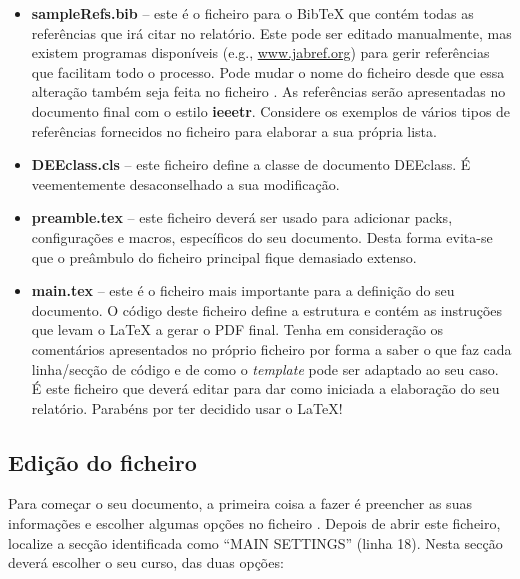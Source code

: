 \begin{itemize}
\item \textbf{sampleRefs.bib} -- este é o ficheiro para o BibTeX que contém todas as referências que irá citar no relatório. Este pode ser editado manualmente, mas existem programas disponíveis (e.g., \url{www.jabref.org}) para gerir referências que facilitam todo o processo. Pode mudar o nome do ficheiro desde que essa alteração também seja feita no ficheiro . As referências serão apresentadas no documento final com o estilo \textbf{ieeetr}. Considere os exemplos de vários tipos de referências fornecidos no ficheiro  para elaborar a sua própria lista.

\item \textbf{DEEclass.cls} -- este ficheiro define a classe de documento DEEclass. É veementemente desaconselhado a sua modificação.

\item \textbf{preamble.tex} -- este ficheiro deverá ser usado para adicionar \glspl{pack}, configurações e macros, específicos do seu documento. Desta forma evita-se que o preâmbulo do ficheiro principal  fique demasiado extenso. 

\item \textbf{main.tex} -- este é o ficheiro mais importante para a definição do seu documento. O código deste ficheiro define a estrutura e contém as instruções que levam o \LaTeX{} a gerar o PDF final. Tenha em consideração os comentários apresentados no próprio ficheiro por forma a saber o que faz cada linha/secção de código e de como o \textit{template} pode ser adaptado ao seu caso. É este ficheiro que deverá editar para dar como iniciada a elaboração do seu relatório. Parabéns por ter decidido usar o \LaTeX{}!
\end{itemize}


\subsection{Edição do ficheiro }
\label{subsec:Ch2.2.3}

Para começar o seu documento, a primeira coisa a fazer é preencher as suas informações e escolher algumas opções no ficheiro . Depois de abrir este ficheiro, localize a secção identificada como ``MAIN SETTINGS'' (linha 18). Nesta secção deverá escolher o seu curso, das duas opções:

